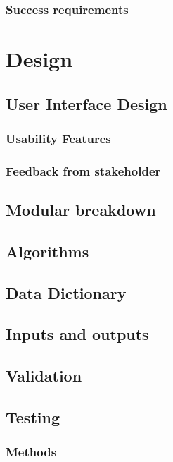 \documentclass{article}
\begin{document}
\subsubsection{Success requirements}

\section{Design}

\subsection{User Interface Design}

\subsubsection{Usability Features}

\subsubsection{Feedback from stakeholder}

\subsection{Modular breakdown}

\subsection{Algorithms}

\subsection{Data Dictionary}

\subsection{Inputs and outputs}

\subsection{Validation}

\subsection{Testing}

\subsubsection{Methods}
\end{document}
